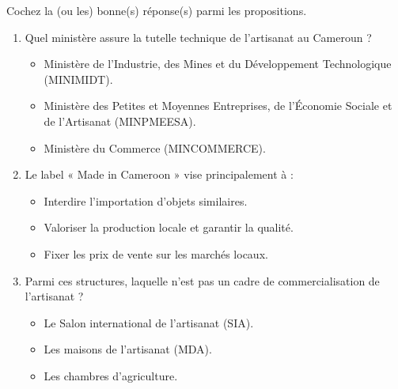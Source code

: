 \documentclass[11pt]{article}
\begin{document}
\begin{exercice}
Cochez la (ou les) bonne(s) réponse(s) parmi les propositions.
\begin{enumerate}
    \item Quel ministère assure la tutelle technique de l'artisanat au Cameroun ?
    \begin{itemize}
        \item[a)] Ministère de l'Industrie, des Mines et du Développement Technologique (MINIMIDT).
        \item[b)] Ministère des Petites et Moyennes Entreprises, de l'Économie Sociale et de l'Artisanat (MINPMEESA).
        \item[c)] Ministère du Commerce (MINCOMMERCE).
    \end{itemize}
    \item Le label « Made in Cameroon » vise principalement à :
    \begin{itemize}
        \item[a)] Interdire l'importation d'objets similaires.
        \item[b)] Valoriser la production locale et garantir la qualité.
        \item[c)] Fixer les prix de vente sur les marchés locaux.
    \end{itemize}
    \item Parmi ces structures, laquelle n'est pas un cadre de commercialisation de l'artisanat ?
    \begin{itemize}
        \item[a)] Le Salon international de l'artisanat (SIA).
        \item[b)] Les maisons de l'artisanat (MDA).
        \item[c)] Les chambres d'agriculture.
    \end{itemize}
\end{enumerate}
\end{exercice}
\end{document}
